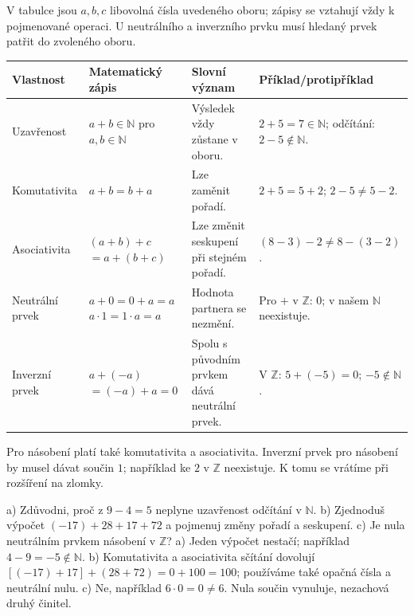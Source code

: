 \documentclass[11pt,a4paper]{article}
\begin{document}
V tabulce jsou $a,b,c$ libovolná čísla uvedeného oboru; zápisy
se vztahují vždy k pojmenované operaci. U neutrálního a inverzního prvku
musí hledaný prvek patřit do zvoleného oboru.
\begin{center}
\small
\begin{tabularx}{\linewidth}{@{}>{\raggedright\arraybackslash}p{24mm}>{\raggedright\arraybackslash}p{37mm}>{\raggedright\arraybackslash}X>{\raggedright\arraybackslash}X@{}}
\toprule
Vlastnost & Matematický zápis & Slovní význam & Příklad/protipříklad\\
\midrule
Uzavřenost & $a+b\in\mathbb N$ pro $a,b\in\mathbb N$
& Výsledek vždy zůstane v oboru.
& $2+5=7\in\mathbb N$; odčítání: $2-5\notin\mathbb N$.\\[2mm]
Komutativita & $a+b=b+a$
& Lze zaměnit pořadí.
& $2+5=5+2$; $2-5\ne5-2$.\\[2mm]
Asociativita & $(a+b)+c$\newline ${}=a+(b+c)$
& Lze změnit seskupení při stejném pořadí.
& $(8-3)-2\ne8-(3-2)$.\\[2mm]
Neutrální prvek & $a+0=0+a=a$\newline $a\cdot1=1\cdot a=a$
& Hodnota partnera se nezmění.
& Pro $+$ v $\mathbb Z$: $0$; v našem $\mathbb N$ neexistuje.\\[2mm]
Inverzní prvek & $a+(-a)$\newline ${}=(-a)+a=0$
& Spolu s původním prvkem dává neutrální prvek.
& V $\mathbb Z$: $5+(-5)=0$; $-5\notin\mathbb N$.\\
\bottomrule
\end{tabularx}
\end{center}
Pro násobení platí také komutativita a asociativita. Inverzní prvek
pro násobení by musel dávat součin $1$; například ke $2$ v $\mathbb Z$
neexistuje. K tomu se vrátíme při rozšíření na zlomky.

\begin{zadaniReseniBox}[title={Samostatná práce 1},breakable=false]
a) Zdůvodni, proč z $9-4=5$ neplyne uzavřenost odčítání v $\mathbb N$.
b) Zjednoduš výpočet $(-17)+28+17+72$ a pojmenuj změny pořadí a seskupení.
c) Je nula neutrálním prvkem násobení v $\mathbb Z$?
\tcblower
a) Jeden výpočet nestačí; například $4-9=-5\notin\mathbb N$.
b) Komutativita a asociativita sčítání dovolují
$[(-17)+17]+(28+72)=0+100=100$; používáme také opačná čísla a neutrální nulu.
c) Ne, například $6\cdot0=0\ne6$. Nula součin vynuluje, nezachová druhý činitel.
\end{zadaniReseniBox}
\end{document}
